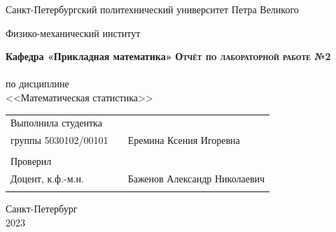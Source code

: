 \documentclass[a4paper]{article}
\begin{document}
\begin{titlepage}
  \begin{center}
    \large
    Санкт-Петербургский политехнический университет Петра Великого
    
    Физико-механический институт
    
    \textbf{Кафедра «Прикладная математика»}
    \vfill
    \textsc{\textbf{\Large{Отчёт по лабораторной работе №2}}}\\[5mm]
    \\ по дисциплине\\ <<Математическая статистика>>\\
\end{center}

\vfill

\begin{tabular}{l p{} l}
Выполнила студентка \\группы 5030102/00101 && Еремина Ксения Игоревна \\
\\
Проверил\\Доцент, к.ф.-м.н.& \hspace{0pt} &   Баженов Александр Николаевич \\\\
\end{tabular}

\hfill \break
\hfill \break
\begin{center} Санкт-Петербург \\2023 \end{center}
\thispagestyle{empty}
\end{titlepage}
\newpage
\newpage
\begin{center}
    \setcounter{page}{2}
    \tableofcontents
\end{center}
\newpage
\begin{center}
    \setcounter{page}{3}
    \listoffigures
\end{center}
\newpage
\end{document}
